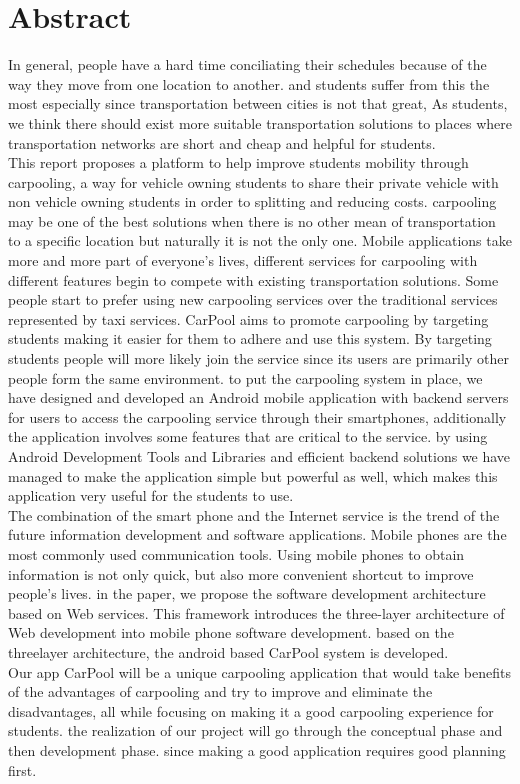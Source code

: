 \chapter*{Abstract}
In general, people have a hard time conciliating their schedules because of the way they move from one location to another.  and students suffer from this the most  especially  since transportation between cities is not that great,  As students, we think there should exist more suitable transportation solutions to places where transportation networks are short and cheap and helpful for students.
\\ This  report  proposes  a  platform  to  help  improve students  mobility  through carpooling, a way for vehicle owning students to share their private vehicle with non vehicle owning students in order to splitting and reducing costs. carpooling may be one of the best solutions when there is no other  mean  of  transportation  to a  specific location  but naturally  it  is not  the  only one. Mobile  applications  take more  and more  part of  everyone’s  lives, different  services for carpooling with different features begin to compete with existing transportation solutions. Some people start to  prefer using  new carpooling  services  over the  traditional services represented  by  taxi  services. CarPool  aims  to  promote  carpooling  by  targeting  students making it easier for them to adhere and use this system.  By  targeting  students  people  will  more  likely  join  the  service  since  its  users  are primarily other people form the same environment. to put the carpooling system in place, we have designed and developed an Android mobile application with backend servers for users  to  access  the  carpooling  service  through  their  smartphones,  additionally  the application  involves  some  features  that  are  critical  to  the  service.  by  using  Android Development  Tools  and  Libraries and  efficient backend  solutions  we  have managed  to make the application simple but powerful as well, which makes this application very useful for the students to use.
\\ The combination of the smart phone and the Internet service is the trend of the future information development and software applications. Mobile phones are the most commonly used communication tools. Using mobile phones to obtain information is not only quick, but also more convenient shortcut to improve people's lives. in the paper, we propose the software development architecture based on Web services. This framework introduces the three-layer architecture of Web development into mobile phone software development. based on the threelayer architecture, the android based CarPool system is developed.
\\ Our app CarPool will be a unique carpooling application that would take benefits of the advantages of carpooling and try to improve and eliminate the disadvantages, all while focusing on making it a good carpooling experience for students. the realization of our project will go through the conceptual phase and then development phase. since making a good application requires good planning first.